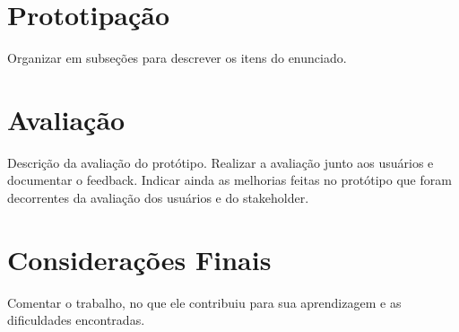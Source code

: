 \documentclass[12pt,brazil,a4paper]{article}
\begin{document}
\section{Prototipação}
\begin{description}
Organizar em subseções para descrever os itens do enunciado.
\end{description}
\section{Avaliação}
\begin{description}
Descrição da avaliação do protótipo. Realizar a avaliação junto aos usuários e documentar o feedback. Indicar ainda as melhorias feitas no protótipo que foram decorrentes da avaliação dos usuários e do stakeholder.
\end{description}
\section{Considerações Finais}
\begin{description}
Comentar o trabalho, no que ele contribuiu para sua aprendizagem e as dificuldades encontradas.
\end{description}
\end{document}
